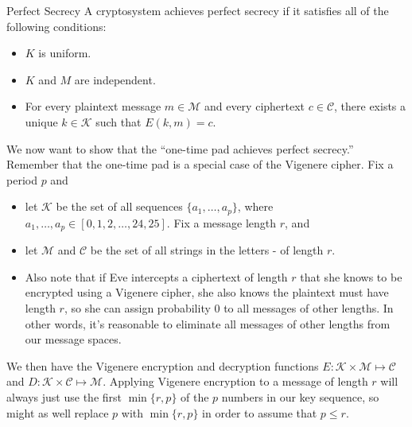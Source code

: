 \documentclass[letterpaper]{article}
\begin{document}
\begin{theorem}{Perfect Secrecy}{}
    A cryptosystem achieves perfect secrecy if it satisfies all of the following conditions: 
    \begin{itemize}
        \item $K$ is uniform. 
        \item $K$ and $M$ are independent.
        \item For every plaintext message $m \in \mathscr{M}$ and every ciphertext $c \in \mathscr{C}$, there exists a unique $k \in \mathscr{K}$ such that $E(k, m) = c$. 
    \end{itemize}
\end{theorem}
We now want to show that the ``one-time pad achieves perfect secrecy.'' Remember that the one-time pad is a special case of the Vigenere cipher. Fix a period $p$ and 
\begin{itemize}
    \item let $\mathscr{K}$ be the set of all sequences $\{a_1, \hdots, a_p\}$, where $a_1, \hdots, a_p \in [0, 1, 2, \hdots, 24, 25]$. Fix a message length $r$, and 
    \item let $\mathscr{M}$ and $\mathscr{C}$ be the set of all strings in the letters - of length $r$. 
    \item Also note that if Eve intercepts a ciphertext of length $r$ that she knows to be encrypted using a Vigenere cipher, she also knows the plaintext must have length $r$, so she can assign probability 0 to all messages of other lengths. In other words, it's reasonable to eliminate all messages of other lengths from our message spaces. 
\end{itemize}
We then have the Vigenere encryption and decryption functions $E: \mathscr{K} \times \mathscr{M} \mapsto \mathscr{C}$ and $D: \mathscr{K} \times \mathscr{C} \mapsto \mathscr{M}$.  Applying Vigenere encryption to a message of length $r$ will always just use the first $\min\{r, p\}$ of the $p$ numbers in our key sequence, so might as well replace $p$ with $\min\{r, p\}$ in order to assume that $p \leq r$. 
\end{document}
